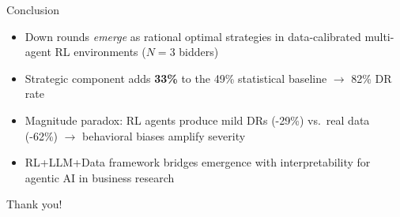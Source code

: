 \documentclass[aspectratio=169]{beamer}
\begin{document}
\begin{frame}{Conclusion}
  \begin{itemize}
    \item Down rounds \emph{emerge} as rational optimal strategies in data-calibrated multi-agent RL environments ($N=3$ bidders)
    \item Strategic component adds \textbf{33\%} to the 49\% statistical baseline $\to$ 82\% DR rate
    \item Magnitude paradox: RL agents produce mild DRs (-29\%) vs.\ real data (-62\%) $\to$ behavioral biases amplify severity
    \item RL+LLM+Data framework bridges emergence with interpretability for agentic AI in business research
  \end{itemize}

  \vspace{0.5cm}
  \begin{center}
    \Large Thank you!
  \end{center}
\end{frame}
\end{document}
